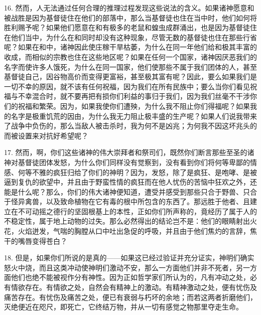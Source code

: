 16. 然而，人无法通过任何合理的推理过程发现这些说法的含义。如果诸神愿意和被战胜是因为基督徒住在他们的部落中，那么当基督徒也住在当中时，他们如何将胜利赐予呢？如果他们愿意在和有极多的老鼠和蝗虫成群涌出，也是因为基督徒住在他们当中，为什么在和同时却没有这种现象，尽管无数的基督徒也住在那些行省呢？如果在和中，诸神因此使庄稼干旱枯萎，为什么在同一年他们给和极其丰富的收成，而相似的宗教也住在这些地区呢？如果在任何一个国家，诸神因厌恶我们的名字而使许多人饿死，为什么在同一国家，他们使那些不属于我们团体的人，甚至基督徒自己，因谷物高价而变得更富裕，甚至极其富有呢？因此，要么如果我们是一切不幸的原因，就不该有任何祝福，因为我们在所有民族中；要么当你们看见祝福与不幸混合时，就不要再把有损你们利益的事归于我们，因为我们丝毫不干涉你们的祝福和繁荣。因为，如果我使你们遭殃，为什么我不阻止你们得福呢？如果我的名字是极重饥荒的因由，为什么我无力阻止极丰盛的生产呢？如果人们说我带来了战争中负伤的，那么当敌人被击杀时，我为何不是凶兆；为何我不因这坏兆头的而被设置来对抗好希望呢？\par

17. 然而，啊，你们这些诸神的伟大崇拜者和祭司们，既然你们断言那些至圣的诸神对基督徒团体发怒，为什么你们同样没有觉察到，没有看到你们将何等卑鄙的情感、何等不雅的疯狂归给了你们的神明？因为，发怒，除了是疯狂、是咆哮、是被逼到复仇的欲望中，并且由于野蛮性情的疯狂而在他人忧伤的苦恼中狂欢之外，还能是什么呢？那么，你们的伟大诸神便知道，遭受并感受到那些只合于野兽、只合于怪异禽兽，以及致命植物在它有毒的根中所包含的东西了。那远胜于他者、且建立在不可动摇之德行的坚固根基上的本性，正如你们所声称的，竟经历了属于人的不稳定性，属于地上动物的过失。那么必然得出的结论岂不是：他们的眼睛射出火花，火焰迸发，气喘的胸膛从口中吐出急促的呼吸，并且由于他们焦灼的言辞，焦干的嘴唇变得苍白？\par

18. 但是，如果你们所说的是真的——如果这已经过验证并充分证实，神明们确实怒火中烧，而且这类冲动使神明们激动不安，那么一方面他们并非不死者，另一方面他们也绝不能被视作分有神性。因为正如哲学家们所认为的，凡有冲动之处，必有情欲存在。有情欲之处，自然会有精神上的激动。有精神激动之处，便有忧伤及痛苦存在。有忧伤及痛苦之处，便已有衰弱与朽坏的余地；而若这两者折磨他们，灭绝便近在咫尺，即死亡，它终结万物，并从一切有感觉之物那里夺走生命。\par

